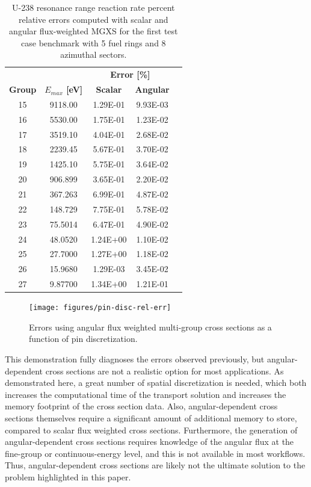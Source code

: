 \begin{table}[h!]
  \centering
  \caption{U-238 resonance range reaction rate percent relative errors computed with scalar and angular flux-weighted MGXS for the first test case benchmark with 5 fuel rings and 8 azimuthal sectors.}
  \label{tab:angular-mgxs-2}
  \begin{tabular}{c c c c c}
  \toprule
  & & \multicolumn{2}{c}{\textbf{Error [\%]}} \\
  \cline{3-4}
  \textbf{Group} & \textbf{\boldmath$E_{max}$ [eV]} & \textbf{Scalar} & \textbf{Angular} \\
  \midrule
  15 & 9118.00 & 1.29E-01 & 9.93E-03 \\
  16 & 5530.00 & 1.75E-01 & 1.23E-02 \\
  17 & 3519.10 & 4.04E-01 & 2.68E-02 \\
  18 & 2239.45 & 5.67E-01 & 3.70E-02 \\
  19 & 1425.10 & 5.75E-01 & 3.64E-02 \\
  20 & 906.899 & 3.65E-01 & 2.20E-02 \\
  21 & 367.263 & 6.99E-01 & 4.87E-02 \\
  22 & 148.729 & 7.75E-01 & 5.78E-02 \\
  23 & 75.5014 & 6.47E-01 & 4.90E-02 \\
  24 & 48.0520 & 1.24E+00 & 1.10E-02 \\
  25 & 27.7000 & 1.27E+00 & 1.18E-02 \\
  26 & 15.9680 & 1.29E-03 & 3.45E-02 \\
  27 & 9.87700 & 1.34E+00 & 1.21E-01 \\
  \bottomrule
\end{tabular}
\end{table}

\begin{figure}
\caption{Errors using angular flux weighted multi-group cross sections as a function of pin discretization.}
\label{fig:angular-mgxs-error}
\texttt{[image: figures/pin-disc-rel-err]}
\end{figure}

This demonstration fully diagnoses the errors observed previously, but angular-dependent cross sections are not a realistic option for most applications.  As demonstrated here, a great number of spatial discretization is needed, which both increases the computational time of the transport solution and increases the memory footprint of the cross section data.  Also, angular-dependent cross sections themselves require a significant amount of additional memory to store, compared to scalar flux weighted cross sections.  Furthermore, the generation of angular-dependent cross sections requires knowledge of the angular flux at the fine-group or continuous-energy level, and this is not available in most workflows.  Thus, angular-dependent cross sections are likely not the ultimate solution to the problem highlighted in this paper.

